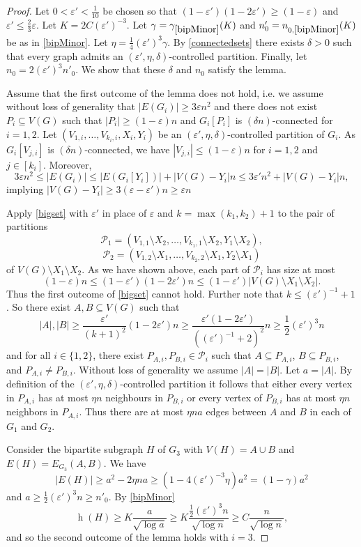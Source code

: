 \documentclass{article}
\newcommand{\eps}{\varepsilon}
\newcommand{\mc}[1]{\mathcal{#1}}
\DeclareMathOperator{\had}{h}
\begin{document}
\begin{proof} Let $0<\eps'<\frac1{10}$ be chosen so that 
$
(1-\eps')(1-2\eps') \geq (1-\eps)$ and $\eps' \leq \frac{2}{3}\eps$.
 Let $K=2C(\eps')^{-3}$. Let $\gamma=\gamma_{\ref{bipMinor}}(K)$ and $n'_0=n_{0,\ref{bipMinor}}(K)$ be as in \cref{bipMinor}. Let $\eta =\frac{1}{4}(\eps')^{3}\gamma$.
By \cref{connectedsets} there exists $\delta > 0$ such that every graph admits an $(\eps',\eta,\delta)$-controlled partition. Finally, let $n_0 = 2 (\eps')^3n'_0$. We show that these $\delta$ and $n_0$ satisfy the lemma.

Assume that the first outcome of the lemma does not hold, i.e. we assume without loss of generality that $|E(G_{i})| \geq 3\eps n^2$  and there does not exist $P_i \subseteq V(G)$ such that $|P_i| \geq (1-\eps)n$ and $G_{i}[P_i]$ is $(\delta n)$-connected for $i=1,2$. 
Let 
$(V_{1,i}, \ldots, V_{k_i,i}, X_i, Y_i)$ be  an $(\eps',\eta,\delta)$-controlled partition of $G_i$. As $G_i[V_{j,i}]$ is $(\delta n)$-connected, we have $|V_{j,i}| \leq (1-\eps)n$ for  $i=1,2$ and $j \in [k_i]$. Moreover, $$3\eps n^2 \leq |E(G_i)| \leq |E(G_i[Y_i])| + |V(G)-Y_i| n \leq 3\eps'n^2 + |V(G)-Y_i| n,$$ implying $|V(G)-Y_i| \geq 3(\eps -\eps')n \geq \eps n$

Apply \cref{bigset} with $\eps'$ in place of $\eps$ and $k =\max(k_1,k_2)+1$ to the pair of  partitions
$$\mathcal{P}_1 = (V_{1,1} \setminus X_2, \ldots, V_{k_1,1} \setminus X_2, Y_1 \setminus X_2),$$
$$\mathcal{P}_2 = (V_{1,2} \setminus X_1, \ldots, V_{k_2,2} \setminus X_1, Y_2 \setminus X_1)$$
of $V(G) \setminus X_1 \setminus X_2$. 
As we have shown above, each part of $\mc{P}_i$ has size at most $$(1-\eps)n \leq (1-\eps')(1-2\eps')n \leq (1-\eps')|V(G) \setminus X_1 \setminus X_2|.$$ Thus the first outcome of \cref{bigset} cannot hold.
Further note that $k \leq (\eps')^{-1}+1$.
 So there exist $A, B \subseteq V(G)$ such that
$$|A|, |B| \geq \frac{\eps'}{(k+1)^2}(1-2\eps') n \geq \frac{\eps'(1-2\eps')}{((\eps')^{-1}+2)^2} n\geq \frac{1}{2}(\eps')^3n$$
and for all $i \in \{1,2\}$, there exist $P_{A,i}, P_{B,i} \in \mathcal{P}_i$ such that $A \subseteq P_{A,i}$, $B \subseteq P_{B,i}$, and $P_{A,i} \neq P_{B,i}$. Without loss of generality we assume $|A|=|B|$. Let $a = |A|$. 
By definition of the $(\eps',\eta,\delta)$-controlled partition it follows that  either every vertex in $P_{A,i}$ has at most $\eta n$ neighbours in $P_{B,i}$ or every vertex of 
 $P_{B,i}$ has at most $\eta n$ neighbors in $P_{A,i}$. Thus there are at most $\eta n a$ edges between $A$ and $B$ in each of $G_1$ and $G_2$. 
 
Consider the bipartite subgraph $H$ of $G_3$ with $V(H)=A \cup B$ and $E(H)=E_{G_3}(A,B)$. We have $$|E(H)| \geq a^2 - 2\eta n a \geq (1- 4(\eps')^{-3}\eta) a^2 = (1-\gamma)a^2$$ and $a \geq \frac{1}{2}(\eps')^3 n \geq n'_0$. By \cref{bipMinor} $$\had(H) \geq K\frac{ a}{\sqrt{\log a}} \geq  K\frac {\frac{1}{2}(\eps')^3n}{\sqrt{\log n}} \geq C\frac{ n}{\sqrt{\log n}},$$
and so the second outcome of the lemma holds with $i=3$.
\end{proof}
\end{document}
